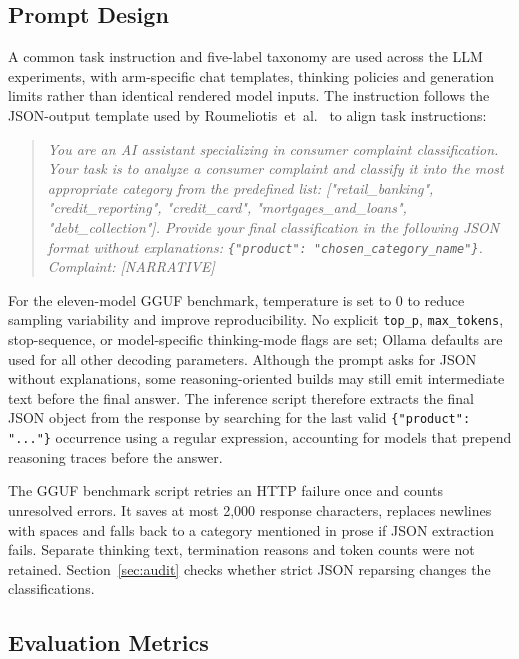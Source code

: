 \documentclass[pdflatex,sn-mathphys-num]{sn-jnl}
\begin{document}
\subsection{Prompt Design}

A common task instruction and five-label taxonomy are used across
the LLM experiments, with arm-specific chat templates, thinking policies
and generation limits rather than identical rendered model inputs.
The instruction follows the JSON-output template
used by Roumeliotis~et~al.\ \cite{roumeliotis2025think} to align
task instructions:

\begin{quote}
\textit{You are an AI assistant specializing in consumer complaint
classification. Your task is to analyze a consumer complaint and
classify it into the most appropriate category from the predefined
list: ["retail\_banking", "credit\_reporting", "credit\_card",
"mortgages\_and\_loans", "debt\_collection"]. Provide your final
classification in the following JSON format without explanations:
\texttt{\{"product": "chosen\_category\_name"\}}. Complaint: [NARRATIVE]}
\end{quote}

For the eleven-model GGUF benchmark, temperature is set to 0 to reduce
sampling variability and improve reproducibility. No explicit
\texttt{top\_p}, \texttt{max\_tokens}, stop-sequence, or model-specific
thinking-mode flags are set; Ollama defaults are used for all other
decoding parameters. Although the prompt asks for JSON without
explanations, some reasoning-oriented builds may still emit
intermediate text before the final answer. The inference script
therefore extracts the final JSON object from the response by searching
for the last valid \texttt{\{"product": "..."\}} occurrence using a
regular expression, accounting for models that prepend reasoning traces
before the answer.

The GGUF benchmark script retries an HTTP failure once and counts unresolved
errors. It saves at most 2,000 response characters, replaces newlines
with spaces and falls back to a category mentioned in prose if JSON
extraction fails. Separate thinking text, termination reasons and
token counts were not retained. Section~\ref{sec:audit} checks whether
strict JSON reparsing changes the classifications.

\subsection{Evaluation Metrics}
\end{document}
